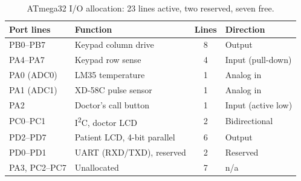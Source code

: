 \begin{table}[t]
  \caption{ATmega32 I/O allocation: 23 lines active, two reserved, seven free.}
  \label{tab:pinout}
  \small
  \begin{tabular}{@{}llcl@{}}
    \toprule
    Port lines & Function & Lines & Direction \\
    \midrule
    PB0--PB7      & Keypad column drive        & 8 & Output \\
    PA4--PA7      & Keypad row sense           & 4 & Input (pull-down) \\
    PA0 (ADC0)    & LM35 temperature           & 1 & Analog in \\
    PA1 (ADC1)    & XD-58C pulse sensor        & 1 & Analog in \\
    PA2           & Doctor's call button       & 1 & Input (active low) \\
    PC0--PC1      & I\textsuperscript{2}C, doctor LCD & 2 & Bidirectional \\
    PD2--PD7      & Patient LCD, 4-bit parallel & 6 & Output \\
    \midrule
    PD0--PD1      & UART (RXD/TXD), reserved   & 2 & Reserved \\
    PA3, PC2--PC7 & Unallocated                & 7 & n/a \\
    \bottomrule
  \end{tabular}
\end{table}
